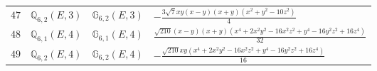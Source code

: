 \documentclass[fleqn,8pt,landscape]{jsarticle}
\begin{document}
\begin{table}[ht!]
\begin{center}
\begin{tabular}{cccl}
$ 47 $ & $ \mathbb{Q}_{6,2}(E,3) $ & $ \mathbb{G}_{6,2}(E,3) $ & $ - \frac{3 \sqrt{7} x y \left(x - y\right) \left(x + y\right) \left(x^{2} + y^{2} - 10 z^{2}\right)}{4} $ \\
$ 48 $ & $ \mathbb{Q}_{6,1}(E,4) $ & $ \mathbb{G}_{6,1}(E,4) $ & $ \frac{\sqrt{210} \left(x - y\right) \left(x + y\right) \left(x^{4} + 2 x^{2} y^{2} - 16 x^{2} z^{2} + y^{4} - 16 y^{2} z^{2} + 16 z^{4}\right)}{32} $ \\
$ 49 $ & $ \mathbb{Q}_{6,2}(E,4) $ & $ \mathbb{G}_{6,2}(E,4) $ & $ - \frac{\sqrt{210} x y \left(x^{4} + 2 x^{2} y^{2} - 16 x^{2} z^{2} + y^{4} - 16 y^{2} z^{2} + 16 z^{4}\right)}{16} $ \\
 \hline \hline
\end{tabular}
\end{center}
\end{table}
\end{document}
